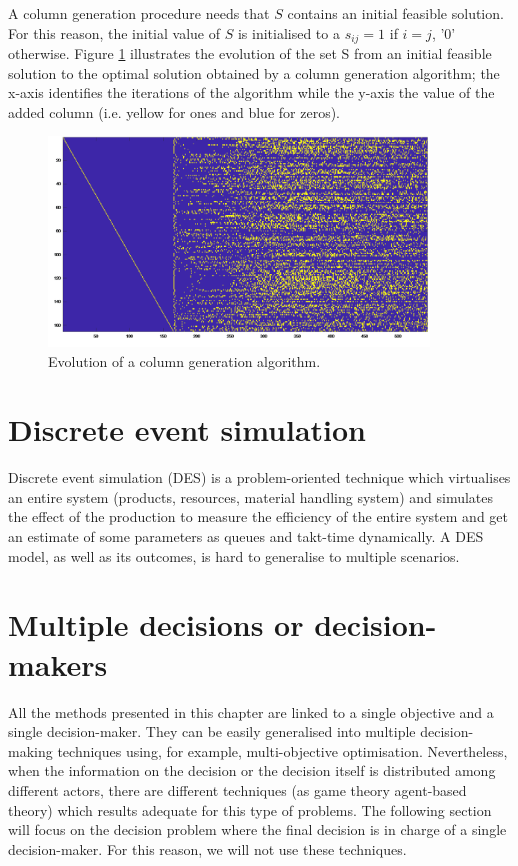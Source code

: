 A column generation procedure needs that $S$ contains an initial feasible solution. For this reason, the initial value of $S$ is initialised to a $s_{ij}=1$ if $i=j$, '0' otherwise. Figure \ref{fig_columnsGeneration} illustrates the evolution of the set S from an initial feasible solution to the optimal solution obtained by a column generation algorithm; the x-axis identifies the iterations of the algorithm while the y-axis the value of the added column (i.e. yellow for ones and blue for zeros).

\begin{figure}[hbt!]
\centering
\includegraphics[width=0.9\textwidth]{SectionLetsMath/prescriptive_fig/fig_columnsGeneration.png}
\captionsetup{type=figure}
\caption{Evolution of a column generation algorithm.}
\label{fig_columnsGeneration}
\end{figure}

\section{Discrete event simulation}
Discrete event simulation (DES) is a problem-oriented technique which virtualises an entire system (products, resources, material handling system) and simulates the effect of the production to measure the efficiency of the entire system and get an estimate of some parameters as queues and takt-time dynamically. A DES model, as well as its outcomes,  is hard to generalise to multiple scenarios.

\section{Multiple decisions or decision-makers}
All the methods presented in this chapter are linked to a single objective and a single decision-maker. They can be easily generalised into multiple decision-making techniques using, for example, multi-objective optimisation. Nevertheless, when the information on the decision or the decision itself is distributed among different actors, there are different techniques (as game theory agent-based theory) which results adequate for this type of problems. The following section will focus on the decision problem where the final decision is in charge of a single decision-maker. For this reason, we will not use these techniques.